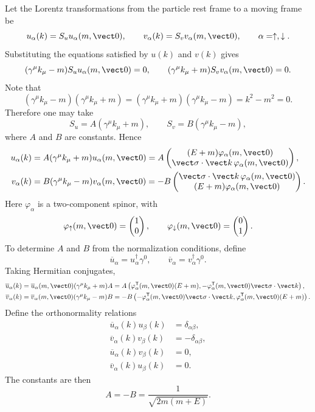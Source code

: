 Let the Lorentz transformations from the particle rest frame to a moving frame be
\[
u_\alpha(k)=S_u u_\alpha(m,\vect0),\qquad
v_\alpha(k)=S_v v_\alpha(m,\vect0),\qquad
\alpha=\uparrow,\downarrow.
\]
Substituting the equations satisfied by $u(k)$ and $v(k)$ gives
\[
(\gamma^\mu k_\mu-m)S_u u_\alpha(m,\vect0)=0,\qquad
(\gamma^\mu k_\mu+m)S_v v_\alpha(m,\vect0)=0.
\]
Note that
\[
(\gamma^\mu k_\mu-m)(\gamma^\mu k_\mu+m)
=(\gamma^\mu k_\mu+m)(\gamma^\mu k_\mu-m)=k^2-m^2=0.
\]
Therefore one may take
\[
S_u=A(\gamma^\mu k_\mu+m),\qquad
S_v=B(\gamma^\mu k_\mu-m),
\]
where $A$ and $B$ are constants. Hence
\begin{align*}
u_\alpha(k)
&=A(\gamma^\mu k_\mu+m)u_\alpha(m,\vect0)
=A\begin{pmatrix}(E+m)\varphi_\alpha(m,\vect0)\\
\vect\sigma\cdot\vect k\,\varphi_\alpha(m,\vect0)\end{pmatrix},\\
v_\alpha(k)
&=B(\gamma^\mu k_\mu-m)v_\alpha(m,\vect0)
=-B\begin{pmatrix}\vect\sigma\cdot\vect k\,\varphi_\alpha(m,\vect0)\\
(E+m)\varphi_\alpha(m,\vect0)\end{pmatrix}.
\end{align*}
Here $\varphi_\alpha$ is a two-component spinor, with
\[
\varphi_\uparrow(m,\vect0)=\begin{pmatrix}1\\0\end{pmatrix},\qquad
\varphi_\downarrow(m,\vect0)=\begin{pmatrix}0\\1\end{pmatrix}.
\]
To determine $A$ and $B$ from the normalization conditions, define
\[
\overline u_\alpha=u_\alpha^\dagger\gamma^0,\qquad
\overline v_\alpha=v_\alpha^\dagger\gamma^0.
\]
Taking Hermitian conjugates,
\begin{align*}
\overline u_\alpha(k)
&=\overline u_\alpha(m,\vect0)(\gamma^\mu k_\mu+m)A
=A\left(\varphi_\alpha^{\mathsf T}(m,\vect0)(E+m),
-\varphi_\alpha^{\mathsf T}(m,\vect0)\vect\sigma\cdot\vect k\right),\\
\overline v_\alpha(k)
&=\overline v_\alpha(m,\vect0)(\gamma^\mu k_\mu-m)B
=-B\left(-\varphi_\alpha^{\mathsf T}(m,\vect0)\vect\sigma\cdot\vect k,
\varphi_\alpha^{\mathsf T}(m,\vect0)(E+m)\right).
\end{align*}
Define the orthonormality relations
\[
\begin{aligned}
\overline u_\alpha(k)u_\beta(k)&=\delta_{\alpha\beta},\\
\overline v_\alpha(k)v_\beta(k)&=-\delta_{\alpha\beta},\\
\overline u_\alpha(k)v_\beta(k)&=0,\\
\overline v_\alpha(k)u_\beta(k)&=0.
\end{aligned}
\]
The constants are then
\[
\boxed{A=-B=\frac{1}{\sqrt{2m(m+E)}}.}
\]